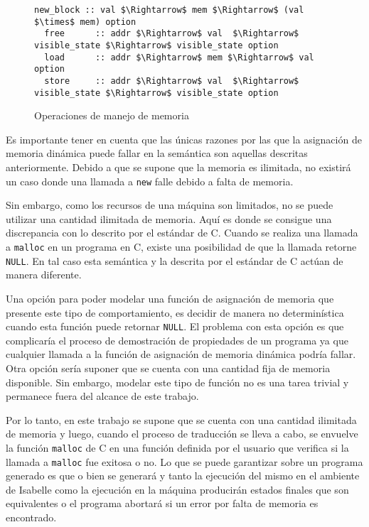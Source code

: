 \begin{figure}
  \begin{lstlisting}[mathescape=true, frame=single]
  new_block :: val $\Rightarrow$ mem $\Rightarrow$ (val $\times$ mem) option
  free      :: addr $\Rightarrow$ val  $\Rightarrow$ visible_state $\Rightarrow$ visible_state option
  load      :: addr $\Rightarrow$ mem $\Rightarrow$ val option
  store     :: addr $\Rightarrow$ val  $\Rightarrow$ visible_state $\Rightarrow$ visible_state option
  \end{lstlisting}

  \caption{Operaciones de manejo de memoria}
  \label{fig:mem_operations}
\end{figure}

Es importante tener en cuenta que las únicas razones por las que la asignación de memoria dinámica puede fallar en la semántica son aquellas descritas anteriormente.
Debido a que se supone que la memoria es ilimitada, no existirá un caso donde una llamada a \verb|new| falle debido a falta de memoria.

Sin embargo, como los recursos de una máquina son limitados, no se puede utilizar una cantidad ilimitada de memoria.
Aquí es donde se consigue una discrepancia con lo descrito por el estándar de C.
Cuando se realiza una llamada a \verb|malloc| en un programa en C, existe una posibilidad de que la llamada retorne \verb|NULL|.
En tal caso esta semántica y la descrita por el estándar de C actúan de manera diferente.

Una opción para poder modelar una función de asignación de memoria que presente este tipo de comportamiento, es decidir de manera no determinística cuando esta función puede retornar \verb|NULL|.
El problema con esta opción es que complicaría el proceso de demostración de propiedades de un programa ya que cualquier llamada a la función de asignación de memoria dinámica podría fallar.
Otra opción sería suponer que se cuenta con una cantidad fija de memoria disponible.
Sin embargo, modelar este tipo de función no es una tarea trivial y permanece fuera del alcance de este trabajo.

Por lo tanto, en este trabajo se supone que se cuenta con una cantidad ilimitada de memoria y luego, cuando el proceso de traducción se lleva a cabo, se envuelve la función \verb|malloc| de C en una función definida por el usuario que verifica si la llamada a \verb|malloc| fue exitosa o no.
Lo que se puede garantizar sobre un programa generado es que o bien se generará y tanto la ejecución del mismo en el ambiente de Isabelle como la ejecución en la máquina producirán estados finales que son equivalentes o el programa abortará si un error por falta de memoria es encontrado.


